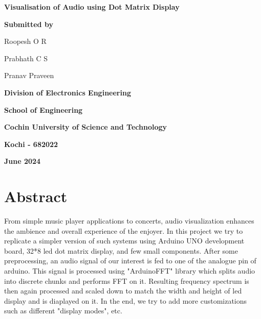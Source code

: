 \documentclass[12pt, a4paper]{article}
\begin{document}
\begin{titlepage}
	\centering
	{\Huge\bfseries Visualisation of Audio using Dot Matrix Display \par}
	\vspace{1.7cm}
	{\Large \textbf{Submitted by} \par}
	\vspace{1cm}
	{\large Roopesh O R\par}
	{\large Prabhath C S\par}
	{\large Pranav Praveen\par}
	\vspace{2cm}

	\par
	\vspace{.3cm}
	{\large \bfseries Division of Electronics Engineering \par}
	{\large \bfseries School of Engineering \par}
	{\large \bfseries Cochin University of Science and Technology \par}
	{\large \bfseries Kochi - 682022 \par}
	\vspace{.5cm}
	{\large \bfseries June 2024 \par}

	\vfill

\end{titlepage}


\newcommand{\usection}[1]{
	\section*{\center \Huge #1}
	\addcontentsline{toc}{section}{\protect\numberline{}#1}
}
\newcommand{\usubsection}[1]{
	\section*{\LARGE #1}
	\addcontentsline{toc}{subsection}{\protect\numberline{}#1}
}

\vspace*{2cm}
\usection{Abstract}
\vspace{.5cm}
From simple music player applications to concerts, audio visualization
enhances the ambience and overall experience of the enjoyer. In this
project we try to replicate a simpler version of such systems using
Arduino UNO development board, 32*8 led dot matrix display, and few small
components. After some preprocessing, an audio signal of our interest is
fed to one of the analogue pin of arduino. This signal is processed 
using "ArduinoFFT" library which splits audio into discrete chunks and
performs FFT on it. Resulting frequency spectrum is then again processed
and scaled down to match the width and height of led display and is
diaplayed on it. In the end, we try to add more customizations such as
different "display modes", etc.
\end{document}
